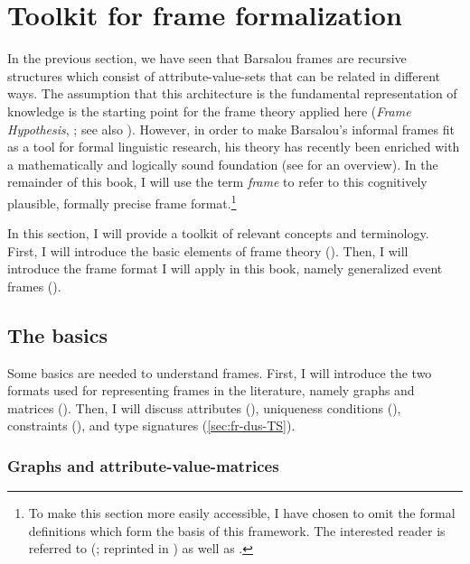 \section{Toolkit for frame formalization} 
\label{sec:fr-dus}
\begin{sloppypar}
In the previous section, we have seen that Barsalou frames are recursive structures which consist of attribute-value-sets that can be related in different ways. The assumption that this architecture is the fundamental representation of knowledge is the starting point for the frame theory applied here (\textit{Frame Hypothesis}, \citealt{Loebner.2014a,Loebner.2017}; see also \citealt{Petersen.2007}). 
However, in order to make Barsalou's informal frames fit as a tool for formal linguistic research, his theory has recently been enriched with a mathematically and logically sound foundation (see \citealt{Loebner.2021} for an overview). In the remainder of this book, I will use the term \textit{frame} to refer to this cognitively plausible, formally precise frame format.\footnote{To make this section more easily accessible, I have chosen to omit the formal definitions which form the basis of this framework. The interested reader is referred to \citeauthor{Petersen.2007} (\citeyear{Petersen.2007}; reprinted in \citealt{Petersen.2015}) as well as \citet{Kallmeyer.2013}.}
\end{sloppypar}

In this section, I will provide a toolkit of relevant concepts and terminology. First, I will introduce the basic elements of frame theory (). 
Then, I will introduce the frame format I will apply in this book, namely generalized event frames ().

\subsection{The basics}
\label{sec:fr-dus-basic}

Some basics are needed to understand frames. First, I will introduce the two formats used for representing frames in the literature, namely graphs and matrices (). Then, I will discuss attributes (), uniqueness conditions \mbox{()}, constraints (), and type signatures (\ref{sec:fr-dus-TS}). 

\subsubsection{Graphs and attribute-value-matrices}
\label{sec:fr-dus-basic-graphs}

